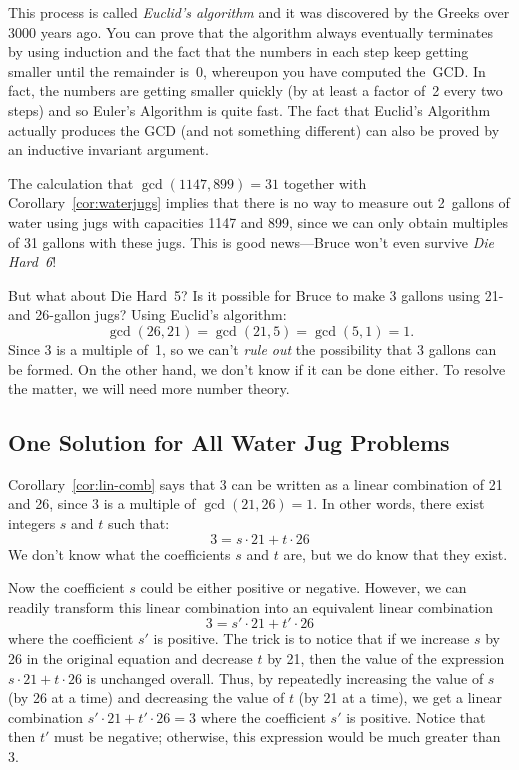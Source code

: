 This process is called \emph{Euclid's algorithm} and it was discovered
by the Greeks over 3000 years ago.  You can prove that the algorithm
always eventually terminates by using induction and the fact that the
numbers in each step keep getting smaller until the remainder is~0,
whereupon you have computed the~GCD\@.  In fact, the numbers are
getting smaller quickly (by at least a factor of~2 every two steps)
and so Euler's Algorithm is quite fast.  The fact that Euclid's
Algorithm actually produces the GCD (and not something different) can
also be proved by an inductive invariant argument.

The calculation that $\gcd(1147, 899) = 31$ together with
Corollary~\ref{cor:waterjugs} implies that there is no way to measure
out 2~gallons of water using jugs with capacities 1147 and 899, since
we can only obtain multiples of 31 gallons with these jugs.  This is
good news---Bruce won't even survive \emph{Die Hard~6}!

But what about Die Hard~5?  Is it
possible for Bruce to make 3 gallons using 21- and 26-gallon
jugs?  Using Euclid's algorithm:
%
\[
\gcd(26, 21) = \gcd(21, 5) = \gcd(5, 1) = 1.
\]
%
Since 3 is a multiple of~1, so we can't \emph{rule out} the possibility
that 3 gallons can be formed.  On the other hand, we don't know if it can be
done either.  To resolve the matter, we will need more number theory.

\subsection{One Solution for All Water Jug Problems}

Corollary~\ref{cor:lin-comb} says that 3 can be written as a linear
combination of 21 and 26, since 3 is a multiple of $\gcd(21, 26) = 1$.
In other words, there exist integers $s$ and $t$ such that:
%
\[
3 = s \cdot 21 + t \cdot 26
\]
%
We don't know what the coefficients $s$ and $t$ are, but we do know
that they exist.

Now the coefficient $s$ could be either positive or negative.
However, we can readily transform this linear combination into an
equivalent linear combination
%
\begin{equation}\label{3sprime21}
3 = s' \cdot 21 + t' \cdot 26
\end{equation}
%
where the coefficient $s'$ is positive.  The trick is to notice that
if we increase $s$ by 26 in the original equation and decrease $t$ by
21, then the value of the expression $s \cdot 21 + t \cdot 26$ is
unchanged overall.  Thus, by repeatedly increasing the value of $s$
(by 26 at a time) and decreasing the value of $t$ (by 21 at a time),
we get a linear combination $s' \cdot 21 + t' \cdot 26 = 3$ where the
coefficient $s'$ is positive.  Notice that then $t'$ must be negative;
otherwise, this expression would be much greater than 3.

